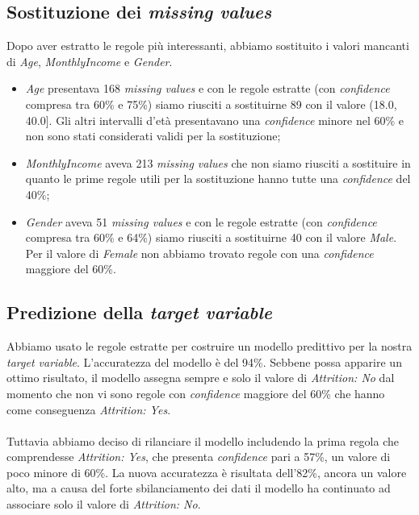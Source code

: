 \subsection{Sostituzione dei \textit{missing values}}
Dopo aver estratto le regole più interessanti, abbiamo sostituito i valori mancanti di \textit{Age}, \textit{MonthlyIncome} e \textit{Gender}.
\begin{itemize}
\item \textit{Age} presentava 168 \textit{missing values} e con le regole estratte (con \textit{confidence} compresa tra 60\% e 75\%) siamo riusciti a sostituirne 89 con il valore (18.0, 40.0]. Gli altri intervalli d'età presentavano una \textit{confidence} minore nel 60\% e non sono stati considerati validi per la sostituzione;
\item \textit{MonthlyIncome} aveva 213 \textit{missing values} che non siamo riusciti a sostituire in quanto le prime regole utili per la sostituzione hanno tutte una \textit{confidence} del 40\%;
\item \textit{Gender} aveva 51 \textit{missing values} e con le regole estratte (con \textit{confidence} compresa tra 60\% e 64\%) siamo riusciti a sostituirne 40 con il valore \textit{Male}. Per il valore di \textit{Female} non abbiamo trovato regole con una \textit{confidence} maggiore del 60\%.
\end{itemize}
\subsection{Predizione della \textit{target variable}}
Abbiamo usato le regole estratte per costruire un modello predittivo per la nostra \textit{target variable}. L'accuratezza del modello è del 94\%. Sebbene possa apparire un ottimo risultato, il modello assegna sempre e solo il valore di \textit{Attrition: No} dal momento che non vi sono regole con \textit{confidence} maggiore del 60\% che hanno come conseguenza \textit{Attrition: Yes}.\\\\
Tuttavia abbiamo deciso di rilanciare il modello includendo la prima regola che comprendesse \textit{Attrition: Yes}, che presenta \textit{confidence} pari a 57\%, un valore di poco minore di 60\%. La nuova accuratezza è risultata dell'82\%, ancora un valore alto, ma a causa del forte sbilanciamento dei dati il modello ha continuato ad associare solo il valore di \textit{Attrition: No}.





